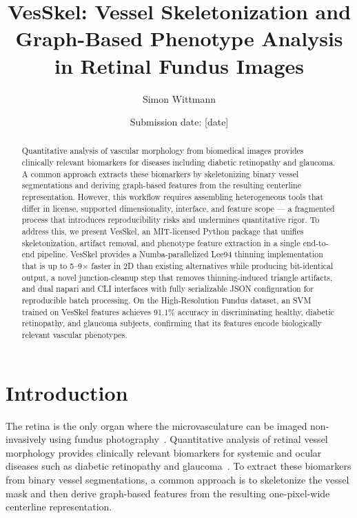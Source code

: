 \documentclass[11pt]{article}
\title{VesSkel: Vessel Skeletonization and Graph-Based Phenotype Analysis in
Retinal Fundus Images}
\author{Simon Wittmann}
\affil{
  Project report\\ %
  Biomedical Network Science\\
  Module title: Project Biomedical Network Science\\
  Semester: SS 2026\\
  Matriculation number: 23760671\\
  Biomedical Network Science Lab, Department Artificial Intelligence in
Biomedical Engineering, Friedrich-Alexander-Universität Erlangen-Nürnberg}
\date{Submission date: [date]}
\begin{document}
\maketitle

\begin{abstract}
  Quantitative analysis of vascular morphology from biomedical images
  provides clinically relevant biomarkers for diseases including
  diabetic retinopathy and glaucoma. A common approach extracts these
  biomarkers by skeletonizing binary vessel segmentations and deriving
  graph-based features from the resulting centerline representation.
  However, this workflow requires assembling heterogeneous tools that
  differ in license, supported dimensionality, interface, and feature
  scope --- a fragmented process that introduces reproducibility risks
  and undermines quantitative rigor. To address this, we present
  VesSkel, an MIT-licensed Python package that unifies skeletonization,
  artifact removal, and phenotype feature extraction in a single
  end-to-end pipeline.   VesSkel provides a Numba-parallelized Lee94
  thinning implementation that is up to 5--9$\times$ faster in 2D
  than existing alternatives while producing bit-identical output, a novel
  junction-cleanup step that removes thinning-induced triangle
  artifacts, and dual napari and CLI interfaces with fully serializable
  JSON configuration for reproducible batch processing. On the
  High-Resolution Fundus dataset, an SVM trained on VesSkel features
  achieves 91.1\% accuracy in discriminating healthy, diabetic
  retinopathy, and glaucoma subjects, confirming that its features
  encode biologically relevant vascular phenotypes.
\end{abstract}

\clearpage

\tableofcontents

\clearpage

\section{Introduction}\label{sec:introduction}

The retina is the only organ where the microvasculature can be imaged
non-invasively using fundus photography~\cite{HRF}. Quantitative
analysis of retinal vessel morphology provides clinically relevant
biomarkers for systemic and ocular diseases such as diabetic
retinopathy and glaucoma~\cite{improved_turtosity}. To extract
these biomarkers from binary vessel segmentations, a common approach
is to skeletonize the vessel mask and then derive graph-based
features from the resulting one-pixel-wide centerline representation.
\end{document}
